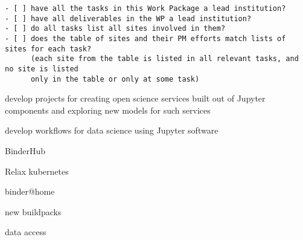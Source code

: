 \begin{draft}
\begin{verbatim}
- [ ] have all the tasks in this Work Package a lead institution?
- [ ] have all deliverables in the WP a lead institution?
- [ ] do all tasks list all sites involved in them?
- [ ] does the table of sites and their PM efforts match lists of sites for each task?
      (each site from the table is listed in all relevant tasks, and no site is listed
      only in the table or only at some task)
\end{verbatim}
\end{draft}

\begin{workpackage}[
  id=impact,
  wphases=0-36,
  swsites,
  title=Broadening impact,
  short=Impact,
  lead=SRL,
  SRLRM=30,
]
\begin{wpobjectives}
 \begin{compactitem}
   \item develop projects for creating open science services built out of Jupyter components and exploring new models for such services
   \item develop workflows for data science using Jupyter software
 \end{compactitem}
\end{wpobjectives}

\begin{wpdescription}

\begin{compactitem}
   \item BinderHub
   \item Relax kubernetes
   \item binder@home
   \item new buildpacks
   \item data access
 \end{compactitem}


\end{wpdescription}
\end{workpackage}
